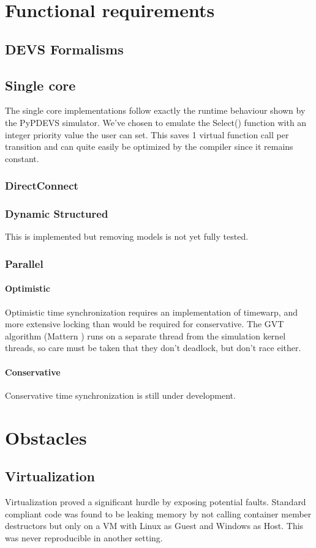 \documentclass[8pt,a4paper]{report}
\begin{document}
\chapter{Functional requirements}
\section{DEVS Formalisms}
\section{Single core}
The single core implementations follow exactly the runtime behaviour shown by the PyPDEVS simulator. We've chosen to emulate the Select() function with an integer priority value the user can set. This saves 1 virtual function call per transition and can quite easily be optimized by the compiler since it remains constant.
\subsection{DirectConnect}
\subsection{Dynamic Structured}
This is implemented but removing models is not yet fully tested.
\subsection{Parallel}
\subsubsection{Optimistic}
Optimistic time synchronization requires an implementation of timewarp, and more extensive locking than would be required for conservative. The GVT algorithm (Mattern \cite{Mattern}) runs on a separate thread from the simulation kernel threads, so care must be taken that they don't deadlock, but don't race either.
\subsubsection{Conservative}
Conservative time synchronization is still under development.


\chapter{Obstacles}
\section{Virtualization}
Virtualization proved a significant hurdle by exposing potential faults. Standard compliant code was found to be leaking memory by not calling container member destructors but only on a VM with Linux as Guest and Windows as Host. This was never reproducible in another setting.
\end{document}
